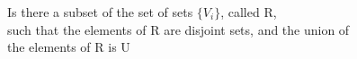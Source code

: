 \documentclass[preview]{standalone}
\begin{document}
\begin{center}
Is there a subset of the set of sets $\{V_i\}$, called R, \\such that the elements of R are disjoint sets, and the union of \\the elements of R is U
\end{center}
\end{document}
